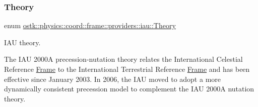 \subsubsection{\texorpdfstring{Theory}{Theory}}
{\footnotesize\ttfamily enum \hyperlink{namespaceostk_1_1physics_1_1coord_1_1frame_1_1providers_1_1iau_ae5e299153ae66dd034c8427dabfaff05}{ostk\+::physics\+::coord\+::frame\+::providers\+::iau\+::\+Theory}\hspace{0.3cm}{\ttfamily [strong]}}



I\+AU theory. 

The I\+AU 2000A precession-\/nutation theory relates the International Celestial Reference \hyperlink{classostk_1_1physics_1_1coord_1_1_frame}{Frame} to the International Terrestrial Reference \hyperlink{classostk_1_1physics_1_1coord_1_1_frame}{Frame} and has been effective since January 2003. In 2006, the I\+AU moved to adopt a more dynamically consistent precession model to complement the I\+AU 2000A nutation theory.

